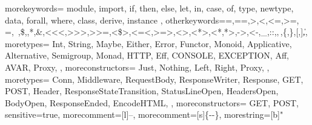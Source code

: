 {
  morekeywords={
    module,
    import,
    if,
    then,
    else,
    let,
    in,
    case,
    of,
    type,
    newtype,
    data,
    forall,
    where,
    class,
    derive,
    instance
  },
  otherkeywords={=,==,>,<,<=,>=,\\=,~,\$,\@,*,\&,<<<,>>>,>>=,<\$>,<=<,>=>,<>,<*>,<*,*>,->,<-,_,::,\(,\),\{,\},[,],\|},
  moretypes={
    Int,
    String,
    Maybe,
    Either,
    Error,
    Functor,
    Monoid,
    Applicative,
    Alternative,
    Semigroup,
    Monad,
    HTTP,
    Eff,
    CONSOLE,
    EXCEPTION,
    Aff,
    AVAR,
    Proxy,
  },
  moreconstructors={
    Just,
    Nothing,
    Left,
    Right,
    Proxy,
  },
  moretypes={
    Conn,
    Middleware,
    RequestBody,
    ResponseWriter,
    Response,
    GET,
    POST,
    Header,
    ResponseStateTransition,
    StatusLineOpen,
    HeadersOpen,
    BodyOpen,
    ResponseEnded,
    EncodeHTML,
  },
  moreconstructors={
    GET,
    POST,
  }
  sensitive=true,
  morecomment=[l]{--}, %
  morecomment=[s]{\{-}{-\}}, %
  morestring=[b]" %
}
